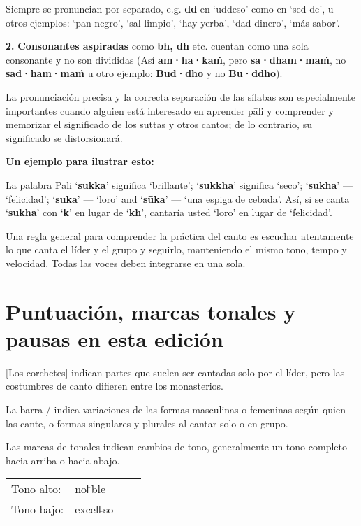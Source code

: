 Siempre se pronuncian por separado, e.g. \textbf{dd} en ‘uddeso’ como en
 ‘sed-de’, u otros ejemplos: ‘pan-negro', ‘sal-limpio', ‘hay-yerba', ‘dad-dinero', ‘más-sabor'.

\textbf{2.} \textbf{Consonantes aspiradas} como \textbf{bh, dh} etc.
cuentan como una sola consonante y no son divididas (Así
\textbf{am·hā·kaṁ}, pero \textbf{sa·dham·maṁ}, no \textbf{sad·ham·maṁ}
u otro ejemplo: \textbf{Bud·dho} y no \textbf{Bu·ddho}).

La pronunciación precisa y la correcta separación de las sílabas son especialmente importantes cuando alguien está interesado en aprender pāli y comprender y memorizar el significado de los suttas y otros cantos; de lo contrario, su significado se distorsionará.


\textbf{Un ejemplo para ilustrar esto:}

La palabra Pāli ‘\textbf{sukka}’ significa ‘brillante’; ‘\textbf{sukkha}’ significa
‘seco’; ‘\textbf{sukha}’ --- ‘felicidad’; ‘\textbf{suka}’ --- ‘loro’ and
‘\textbf{sūka}’ --- ‘una espiga de cebada'.
Así, si se canta ‘\textbf{sukha}’ con ‘\textbf{k}’ en lugar de
‘\textbf{kh}’, cantaría usted ‘loro’ en lugar de ‘felicidad’.

Una regla general para comprender la práctica del canto es escuchar atentamente lo que canta el líder y el grupo y seguirlo, manteniendo el mismo tono, tempo y velocidad. Todas las voces deben integrarse en una sola.

\section{Puntuación, marcas tonales y pausas en esta edición}

[Los corchetes] indican partes que suelen ser cantadas solo por el líder, pero las costumbres de canto difieren entre los monasterios.

La barra / indica variaciones de las formas masculinas o femeninas según quien las cante, o formas singulares y plurales al cantar solo o en grupo.

Las marcas de tonales indican cambios de tono, generalmente un tono completo hacia arriba o hacia abajo.

\begin{tabular}{llll}
	Tono alto: & no꜓ble \\
	Tono bajo: & excel꜕so \\
\end{tabular}

%
